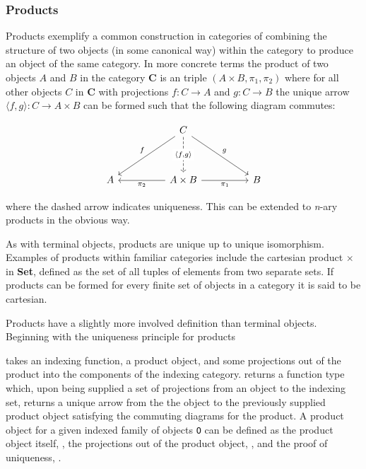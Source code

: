 \subsubsection{Products}
Products exemplify a common construction in categories of combining the
structure of two objects (in some canonical way) within the category to produce
an object of the same category. In more concrete terms the product of two
objects $A$ and $B$ in the category $\textbf{C}$ is an triple $(A \times B,
\pi_{1}, \pi_{2})$ where for all other objects $C$ in $\textbf{C}$ with
projections $f: C \rightarrow A$ and $g: C \rightarrow B$ the unique arrow
$\langle f, g\rangle : C \rightarrow A \times B$ can be formed such that the
following diagram commutes:

\[\begin{tikzcd}[sep=huge]
 & C \arrow[ld, "f"'] \arrow[rd, "g"] \arrow[d, "{\langle f, g\rangle}" description, dashed] &  \\
A & A \times B \arrow[l, "\pi_2"] \arrow[r, "\pi_1"'] & B
\end{tikzcd}\]

where the dashed arrow indicates uniqueness. This can be extended to
\textit{n}-ary products in the obvious way.

As with terminal objects, products are unique up to unique isomorphism. Examples
of products within familiar categories include the cartesian product $\times$ in
\textbf{Set}, defined as the set of all tuples of elements from two separate
sets. If products can be formed for every finite set of objects in a category it
is said to be cartesian.

Products have a slightly more involved definition than terminal objects. Beginning
with the uniqueness principle for products


 takes an indexing function, a product object, and some
projections out of the product into the components of the indexing category.
 returns a function type which, upon being supplied a
set of projections from an object to the indexing set, returns a unique arrow
from the the object to the previously supplied product object satisfying the
commuting diagrams for the product. A product object for a given indexed family
of objects \verb|O| can be defined as the product object itself,
, the projections out of the product object, ,
and the proof of uniqueness, .

